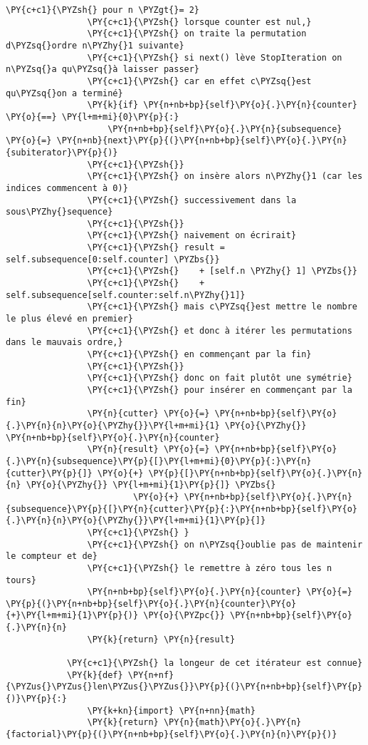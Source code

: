 \begin{Verbatim}[commandchars=\\\{\}]
                \PY{c+c1}{\PYZsh{} pour n \PYZgt{}= 2}
                \PY{c+c1}{\PYZsh{} lorsque counter est nul,}
                \PY{c+c1}{\PYZsh{} on traite la permutation d\PYZsq{}ordre n\PYZhy{}1 suivante}
                \PY{c+c1}{\PYZsh{} si next() lève StopIteration on n\PYZsq{}a qu\PYZsq{}à laisser passer}
                \PY{c+c1}{\PYZsh{} car en effet c\PYZsq{}est qu\PYZsq{}on a terminé}
                \PY{k}{if} \PY{n+nb+bp}{self}\PY{o}{.}\PY{n}{counter} \PY{o}{==} \PY{l+m+mi}{0}\PY{p}{:}
                    \PY{n+nb+bp}{self}\PY{o}{.}\PY{n}{subsequence} \PY{o}{=} \PY{n+nb}{next}\PY{p}{(}\PY{n+nb+bp}{self}\PY{o}{.}\PY{n}{subiterator}\PY{p}{)}
                \PY{c+c1}{\PYZsh{}}
                \PY{c+c1}{\PYZsh{} on insère alors n\PYZhy{}1 (car les indices commencent à 0)}
                \PY{c+c1}{\PYZsh{} successivement dans la sous\PYZhy{}sequence}
                \PY{c+c1}{\PYZsh{}}
                \PY{c+c1}{\PYZsh{} naivement on écrirait}
                \PY{c+c1}{\PYZsh{} result = self.subsequence[0:self.counter] \PYZbs{}}
                \PY{c+c1}{\PYZsh{}    + [self.n \PYZhy{} 1] \PYZbs{}}
                \PY{c+c1}{\PYZsh{}    + self.subsequence[self.counter:self.n\PYZhy{}1]}
                \PY{c+c1}{\PYZsh{} mais c\PYZsq{}est mettre le nombre le plus élevé en premier}
                \PY{c+c1}{\PYZsh{} et donc à itérer les permutations dans le mauvais ordre,}
                \PY{c+c1}{\PYZsh{} en commençant par la fin}
                \PY{c+c1}{\PYZsh{}}
                \PY{c+c1}{\PYZsh{} donc on fait plutôt une symétrie}
                \PY{c+c1}{\PYZsh{} pour insérer en commençant par la fin}
                \PY{n}{cutter} \PY{o}{=} \PY{n+nb+bp}{self}\PY{o}{.}\PY{n}{n}\PY{o}{\PYZhy{}}\PY{l+m+mi}{1} \PY{o}{\PYZhy{}} \PY{n+nb+bp}{self}\PY{o}{.}\PY{n}{counter}
                \PY{n}{result} \PY{o}{=} \PY{n+nb+bp}{self}\PY{o}{.}\PY{n}{subsequence}\PY{p}{[}\PY{l+m+mi}{0}\PY{p}{:}\PY{n}{cutter}\PY{p}{]} \PY{o}{+} \PY{p}{[}\PY{n+nb+bp}{self}\PY{o}{.}\PY{n}{n} \PY{o}{\PYZhy{}} \PY{l+m+mi}{1}\PY{p}{]} \PYZbs{}
                         \PY{o}{+} \PY{n+nb+bp}{self}\PY{o}{.}\PY{n}{subsequence}\PY{p}{[}\PY{n}{cutter}\PY{p}{:}\PY{n+nb+bp}{self}\PY{o}{.}\PY{n}{n}\PY{o}{\PYZhy{}}\PY{l+m+mi}{1}\PY{p}{]}
                \PY{c+c1}{\PYZsh{} }
                \PY{c+c1}{\PYZsh{} on n\PYZsq{}oublie pas de maintenir le compteur et de}
                \PY{c+c1}{\PYZsh{} le remettre à zéro tous les n tours}
                \PY{n+nb+bp}{self}\PY{o}{.}\PY{n}{counter} \PY{o}{=} \PY{p}{(}\PY{n+nb+bp}{self}\PY{o}{.}\PY{n}{counter}\PY{o}{+}\PY{l+m+mi}{1}\PY{p}{)} \PY{o}{\PYZpc{}} \PY{n+nb+bp}{self}\PY{o}{.}\PY{n}{n}
                \PY{k}{return} \PY{n}{result}
        
            \PY{c+c1}{\PYZsh{} la longeur de cet itérateur est connue}
            \PY{k}{def} \PY{n+nf}{\PYZus{}\PYZus{}len\PYZus{}\PYZus{}}\PY{p}{(}\PY{n+nb+bp}{self}\PY{p}{)}\PY{p}{:}
                \PY{k+kn}{import} \PY{n+nn}{math}
                \PY{k}{return} \PY{n}{math}\PY{o}{.}\PY{n}{factorial}\PY{p}{(}\PY{n+nb+bp}{self}\PY{o}{.}\PY{n}{n}\PY{p}{)}
\end{Verbatim}


